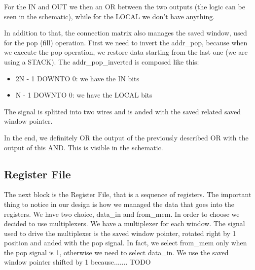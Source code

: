 \documentclass{article}
\begin{document}
For the IN and OUT we then an OR between the two outputs (the logic can be seen in the schematic), while for the LOCAL we don't have anything.

In addition to that, the connection matrix also manages the saved window, used for the pop (fill) operation. First we need to invert the addr\_pop, because when we execute the pop operation, we restore data starting from the last one (we are using a STACK).
The addr\_pop\_inverted is composed like this:
\begin{itemize}
  \item 2N - 1 DOWNTO 0: we have the IN bits 
  \item N - 1 DOWNTO 0: we have the LOCAL bits
\end{itemize}

The signal is splitted into two wires and is anded with the saved related saved window pointer. 

In the end, we definitely OR the output of the previously described OR with the output of this AND. This is visible in the schematic. 


\newpage

\subsection{Register File}

The next block is the Register File, that is a sequence of registers. The important thing to notice in our design is how we managed the data that goes into the registers. We have two choice, data\_in and from\_mem. In order to choose we decided to use multiplexers. 
We have a multiplexer for each window. The signal used to drive the multiplexer is the saved window pointer, rotated right by 1 position and anded with the pop signal. In fact, we select from\_mem only when the pop signal is 1, otherwise we need to select data\_in. 
We use the saved window pointer shifted by 1 because....... TODO
\end{document}
